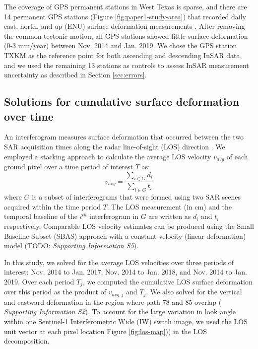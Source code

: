 \documentclass{utexasthesis}
\begin{document}
The coverage of GPS permanent stations in West Texas is sparse, and there are 14 permanent GPS stations (Figure \ref{fig:paper1-study-area}) that recorded daily east, north, and up (ENU) surface deformation measurements \citep{Blewitt2018HarnessingGpsData}. After removing the common tectonic motion, all GPS stations showed little surface deformation (0-3 mm/year) between Nov. 2014 and Jan. 2019. We chose the GPS station TXKM as the reference point for both ascending and descending InSAR data, and we used the remaining 13 stations as controls to assess InSAR measurement uncertainty as described in Section \ref{sec:errors}.

\subsection{Solutions for cumulative surface deformation over time}
\label{sec:stacking}
An interferogram measures surface deformation that occurred between the two SAR acquisition times along the radar line-of-sight (LOS) direction \citep{Hanssen2001RadarInterferometryData}. We employed a stacking approach \citep{Sandwell1998PhaseGradientApproach} to calculate the average LOS velocity $v_{avg}$ of each ground pixel over a time period of interest $T$ as:
\begin{equation}
	v_{avg} = \frac{\sum_{i \in G} d_i}{\sum_{i \in G} t_i}
	\label{eq:stacking}
\end{equation}
where $G$ is a subset of interferograms that were formed using two SAR scenes acquired within the time period $T$. The LOS measurement (in cm) and the temporal baseline of the $i^{th}$ interferogram in $G$ are written as $d_i$ and $ t_i $ respectively. Comparable LOS velocity estimates can be produced using the Small Baseline Subset (SBAS) approach \citep{Berardino2002NewAlgorithmSurface} with a constant velocity (linear deformation) model (TODO: \textit{Supporting Information S5}).

In this study, we solved for the average LOS velocities over three periods of interest: Nov. 2014 to Jan. 2017, Nov. 2014 to Jan. 2018, and Nov. 2014 to Jan. 2019. Over each period $T_j$, we computed the cumulative LOS surface deformation over this period as the product of $v_{avg,j}$ and $T_j$. We also solved for the vertical and eastward deformation in the region where path 78 and 85 overlap ( \textit{Supporting Information S2}). To account for the large variation in look angle within one Sentinel-1 Interferometric Wide (IW) swath image, we used the LOS unit vector at each pixel location Figure \ref{fig:los-map})) in the LOS decomposition.
\end{document}
